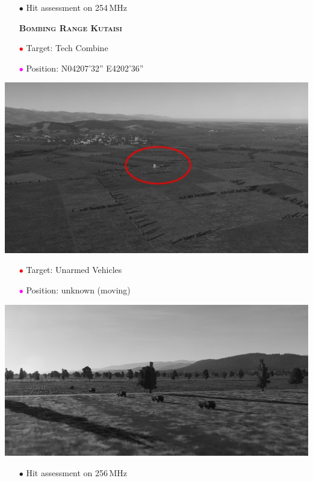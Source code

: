 \documentclass[a4paper,12pt,dvipsnames]{letter}
\newcommand{\Deg}{\textdegree{}}
\newcommand{\DMS}[3]{#1\Deg#2'#3''}
\newcommand{\myHead}[1]{{\LARGE\textsc{\textbf{#1}}}}
\newcommand{\bi}{\textcolor{ProcessBlue}{$\bullet$\;}}
\newcommand{\ri}{\textcolor{Red}{$\bullet$\;}}
\newcommand{\mi}{\textcolor{Magenta}{$\bullet$\;}}
\begin{document}
{\begin{center}
\end{center}
\begin{itemize}
 \item[\bi] Hit assessment on 254\,MHz
\end{itemize}
%
\newpage
\begin{itemize}
 \item[] \myHead{Bombing Range Kutaisi}
 \item[\ri] Target: Tech Combine
 \item[\mi] Position: N\DMS{042}{07}{32} E\DMS{42}{02}{36}
\end{itemize}
\begin{center}
 \includegraphics[width=0.7\linewidth]{../_kneeboard/Range_Kutaisi_Pic1.png}
\end{center}
\begin{itemize}
 \item[\ri] Target: Unarmed Vehicles
 \item[\mi] Position: unknown (moving)
\end{itemize}
\begin{center}
 \includegraphics[width=0.7\linewidth]{../_kneeboard/Range_Kutaisi_Mobile.png}
\end{center}
\begin{itemize}
 \item[\bi] Hit assessment on 256\,MHz
\end{itemize}
%
}
\end{document}
